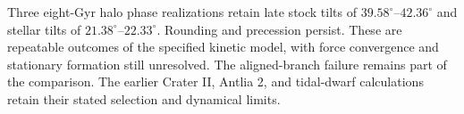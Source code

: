 Three eight-Gyr halo phase realizations retain late stock tilts of
$39.58^\circ$--$42.36^\circ$ and stellar tilts of
$21.38^\circ$--$22.33^\circ$. Rounding and precession persist.
These are repeatable outcomes of the specified kinetic model, with
force convergence and stationary formation still unresolved. The
aligned-branch failure remains part of the comparison. The earlier
Crater II, Antlia 2, and tidal-dwarf calculations retain their stated
selection and dynamical limits. 

